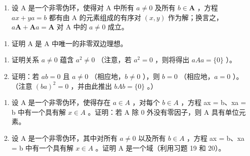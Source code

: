 \begin{enumerate}
\def\labelenumi{\arabic{enumi}.}
\setcounter{enumi}{18}
\tightlist
\item
  设 A 是一个非零伪环，使得对 A 中所有 \(a \neq 0\) 及所有 \(b \in \mathbf{A}\) ，方程 \(ax + ya = b\) 都有由 A 的元素组成的有序对 \((x, y)\) 作为解；换言之，\(a\mathbf{A} + \mathbf{A}a = \mathbf{A}\) 对 A 中的 \(a \neq 0\) 成立。
\end{enumerate}

\begin{enumerate}
\def\labelenumi{(\alph{enumi})}
\tightlist
\item
  证明 A 是 A 中唯一的非零双边理想。
\end{enumerate}

\begin{enumerate}
\def\labelenumi{(\alph{enumi})}
\setcounter{enumi}{1}
\item
  证明关系 \(a \neq 0\) 蕴含 \(a^2 \neq 0\) （注意，若 \(a^2 = 0\) ，则将得出 \(aAa = \{0\}\) ）。
\item
  证明：若 \(ab = 0\) 且 \(a \neq 0\) （相应地，\(b \neq 0\) ），则 \(b = 0\) （相应地，\(a = 0\) ）。（注意 \((ba)^2 = 0\) ，并由此推出 \(bAb = \{0\}\) 。）
\end{enumerate}

\begin{enumerate}
\def\labelenumi{\arabic{enumi}.}
\setcounter{enumi}{19}
\item
  设 A 是一个非零伪环，使得存在 \(a \in A\) ，对每个 \(b \in A\) ，方程 ax = b、xa = b 中有一个具有解 \(x \in A\) 。证明：若 A 除 0 外没有零因子，则 A 具有单位元素。
\item
  设 A 是一个非零伪环，其中对所有 \(a \neq 0\) 以及所有 \(b \in A\) ，方程 ax = b、xa = b 中有一个具有解 \(x \in A\) 。证明 A 是一个域（利用习题 19 和 20）。
\end{enumerate}

